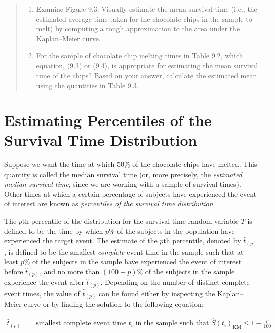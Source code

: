 \documentclass[
]{report}
\providecommand{\tightlist}{%
  \setlength{\itemsep}{0pt}\setlength{\parskip}{0pt}}
\begin{document}
\begin{quote}
\begin{enumerate}
\def\labelenumi{\arabic{enumi}.}
\setcounter{enumi}{20}
\tightlist
\item
  Examine Figure 9.3. Visually estimate the mean survival time (i.e., the estimated average time taken for the chocolate chips in the sample to melt) by computing a rough approximation to the area under the Kaplan--Meier curve.\\
\item
  For the sample of chocolate chip melting times in Table 9.2, which equation, (9.3) or (9.4), is appropriate for estimating the mean survival time of the chips? Based on your answer, calculate the estimated mean using the quantities in Table 9.3.
\end{enumerate}
\end{quote}

\section{Estimating Percentiles of the Survival Time Distribution}\label{estimating-percentiles-of-the-survival-time-distribution}

Suppose we want the time at which 50\% of the chocolate chips have melted. This quantity is called the median survival time (or, more precisely, the \emph{estimated median survival time}, since we are working with a sample of survival times). Other times at which a certain percentage of subjects have experienced the event of interest are known as \emph{percentiles of the survival time distribution}.

The \(p\)th percentile of the distribution for the survival time random variable \(T\) is defined to be the time by which \(p\%\) of the subjects in the population have experienced the target event. The estimate of the \(p\)th percentile, denoted by \(\hat t_{(p)}\), is defined to be the smallest \emph{complete} event time in the sample such that at least \(p\%\) of the subjects in the sample have experienced the event of interest before \(\hat t_{(p)}\), and no more than \((100 - p)\%\) of the subjects in the sample experience the event after \(\hat t_{(p)}\). Depending on the number of distinct complete event times, the value of \(\hat t_{(p)}\) can be found either by inspecting the Kaplan--Meier curve or by finding the solution to the following equation:

\begin{align}
\hat t_{(p)} &= \text{smallest complete event time }t_i\text{ in the sample such that } \hat S(t_i)_{\mathrm{KM}} \le 1 - \frac{p}{100}
\tag{9.5}
\end{align}
\end{document}
